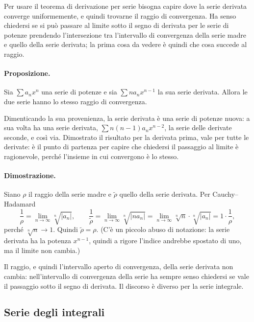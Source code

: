 Per usare il teorema di derivazione per serie bisogna capire dove la serie derivata converge uniformemente, e
quindi trovarne il raggio di convergenza.
Ha senso chiedersi se si può passare al limite sotto il segno di derivata per le serie di potenze prendendo
l'intersezione tra l'intervallo di convergenza della serie madre e quello della serie derivata; la prima cosa da
vedere è quindi che cosa succede al raggio.

\paragraph{Proposizione.}
Sia $\sum a_n x^n$ una serie di potenze e sia $\sum n a_n x^{n-1}$ la sua serie derivata. Allora le due serie
hanno lo stesso raggio di convergenza.

Dimenticando la sua provenienza, la serie derivata è una serie di potenze nuova: a sua volta ha una serie
derivata, $\sum n(n-1) a_n x^{n-2}$, la serie delle derivate seconde, e così via. Dimostrato il risultato per la
derivata prima, vale per tutte le derivate: è il punto di partenza per capire che chiedersi il passaggio al
limite è ragionevole, perché l'insieme in cui convergono è lo stesso.

\paragraph{Dimostrazione.}
Siano $\rho$ il raggio della serie madre e $\tilde\rho$ quello della serie derivata. Per Cauchy--Hadamard
\[
  \frac{1}{\rho} = \lim_{n\to\infty} \sqrt[n]{|a_n|} ,
  \qquad
  \frac{1}{\tilde\rho} = \lim_{n\to\infty} \sqrt[n]{|n a_n|}
  = \lim_{n\to\infty} \sqrt[n]{n}\cdot\sqrt[n]{|a_n|} = 1\cdot\frac{1}{\rho} ,
\]
perché $\sqrt[n]{n}\to 1$. Quindi $\tilde\rho = \rho$.
(C'è un piccolo abuso di notazione: la serie derivata ha la potenza $x^{n-1}$, quindi a rigore l'indice
andrebbe spostato di uno, ma il limite non cambia.)

Il raggio, e quindi l'intervallo aperto di convergenza, della serie derivata non cambia: nell'intervallo di
convergenza della serie ha sempre senso chiedersi se vale il passaggio sotto il segno di derivata. Il discorso
è diverso per la serie integrale.

\subsection{Serie degli integrali}

